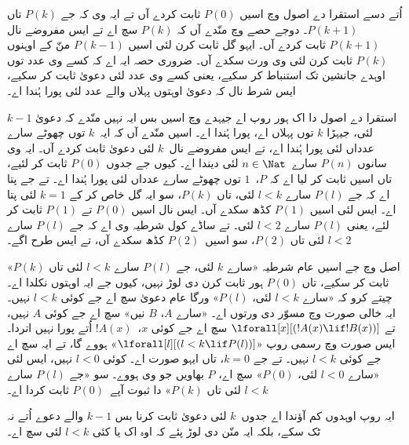 \documentclass[../../../include/open-logic-section]{subfiles}
\begin{document}


اُتے دسے استقرا دے اصول وچ اسیں $P(0)$ ثابت کردے آں تے ایہ وی کہ جے $P(k)$ تاں $P(k+1)$۔ دوجے حصے وچ منّدے آں کہ $P(k)$ سچ اے تے ایس مفروضے نال $P(k+1)$ ثابت کردے آں۔ ایہو گل ثابت کرن لئی اسیں $P(k-1)$ منّ کے اوہنوں $P(k)$ ثابت کرن لئی وی ورت سکدے آں۔ ضروری حصہ ایہ اے کہ کسے وی عدد توں اوہدے جانشین تک استنباط کر سکیے، یعنی کسے وی عدد لئی دعویٰ ثابت کر سکیے، ایس شرط نال کہ دعویٰ اوہتوں پہلاں والے عدد لئی پورا ہُندا اے۔

استقرا دے اصول دا اک ہور روپ اے جیہدے وچ اسیں بس ایہ نہیں منّدے کہ دعویٰ $k-1$ لئی، جیہڑا $k$ توں پہلاں اے، پورا ہُندا اے۔ اسیں منّدے آں کہ ایہ~$k$ توں چھوٹے سارے عدداں لئی پورا ہُندا اے، تے ایس مفروضے نال~$k$ لئی دعویٰ ثابت کردے آں۔ ایہ وی سانوں $P(n)$ سارے~$n \in
\Nat$ لئی دیندا اے۔ کیوں جے جدوں $P(0)$ ثابت کر لئیے، تاں اسیں ثابت کر لیا اے کہ $P$،~$1$ توں چھوٹے سارے عدداں لئی پورا ہُندا اے۔ تے جے پتا اے کہ جے $P(l)$ سارے $l<k$ لئی، تاں $P(k)$، سو ایہ گل خاص کر کے $k=1$ لئی پتا اے۔ ایس لئی اسیں $P(1)$ کڈھ سکدے آں۔ ایس نال اسیں $P(0)$ تے $P(1)$ ثابت کر لئے، یعنی $P(l)$ سارے $l<2$ لئی۔ تے ساڈے کول شرطیہ وی اے کہ جے $P(l)$ سارے $l<2$ لئی تاں $P(2)$، سو اسیں~$P(2)$ کڈھ سکدے آں، تے ایس طرح اگے۔

اصل وچ جے اسیں عام شرطیہ «سارے $k$ لئی، جے $P(l)$ سارے $l<k$ لئی تاں $P(k)$» ثابت کر سکیے، تاں $P(0)$ ہور ثابت کرن دی لوڑ نہیں، کیوں جے ایہ اوہتوں نکلدا اے۔ چیتے کرو کہ «سارے $l<k$ لئی، $P(l)$» ورگا عام دعویٰ سچ اے جے کوئی $l<k$ نہیں۔ ایہ خالی صورت وچ مسوّر دی ورتوں اے۔ «سارے $A$، $B$ نیں» سچ اے جے کوئی $A$ نہیں، تے $\lforall[x][(!A(x) \lif !B(x))]$ سچ اے جے کوئی $x$،~$!A(x)$ اُتے پورا نہیں اتردا۔ ایس صورت وچ رسمی روپ «$\lforall[l][(l < k \lif P(l))]$» ہووے گا، تے ایہ سچ اے جے کوئی $l < k$ نہیں۔ تے جے $k=0$، تاں ایہو صورت اے۔ کوئی $l<0$ نہیں، ایس لئی «سارے $l<0$ لئی، $P(0)$» سچ اے، $P$ بھاویں جو وی ہووے۔ سو «جے $P(l)$ سارے $l<k$ لئی تاں $P(k)$» دا ثبوت آپے~$P(0)$ ثابت کردا اے۔

ایہ روپ اوہدوں کم آؤندا اے جدوں~$k$ لئی دعویٰ ثابت کرنا بس $k-1$ والے دعوے اُتے نہ ٹک سکے، بلکہ ایہ منّن دی لوڑ پئے کہ اوہ اک یا کئی $l<k$ لئی سچ اے۔
\end{document}
